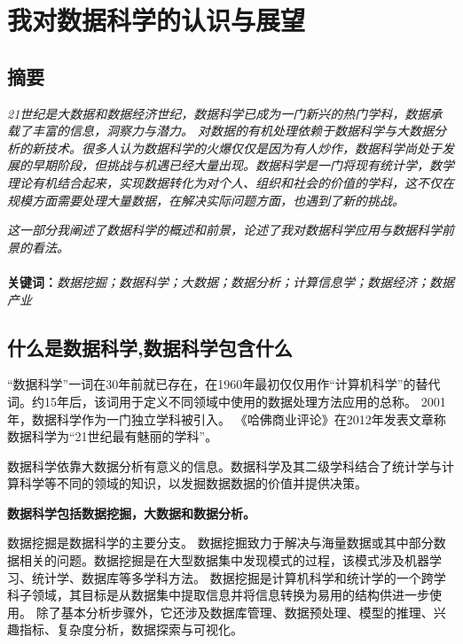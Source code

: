 \documentclass[a4paper, 11pt,twoside=true,UTF8]{scrartcl}
\begin{document}
\restoregeometry
\setcounter{page}{1}
\tableofcontents
\newpage
{}
\restoregeometry

\section{我对数据科学的认识与展望}
\subsection*{摘要}

\qquad \textit{21世纪是大数据和数据经济世纪，数据科学已成为一门新兴的热门学科，数据承载了丰富的信息，洞察力与潜力。 对数据的有机处理依赖于数据科学与大数据分析的新技术。很多人认为数据科学的火爆仅仅是因为有人炒作，数据科学尚处于发展的早期阶段，但挑战与机遇已经大量出现。数据科学是一门将现有统计学，数学理论有机结合起来，实现数据转化为对个人、组织和社会的价值的学科，这不仅在规模方面需要处理大量数据，在解决实际问题方面，也遇到了新的挑战。}

\textit{这一部分我阐述了数据科学的概述和前景，论述了我对数据科学应用与数据科学前景的看法。}
\\ \\
\textbf{关键词：}\textit{数据挖掘；数据科学；大数据；数据分析；计算信息学；数据经济；数据产业}

\subsection{什么是数据科学,数据科学包含什么}
\qquad “数据科学”一词在30年前就已存在，在1960年最初仅仅用作“计算机科学”的替代词。约15年后，该词用于定义不同领域中使用的数据处理方法应用的总称。 2001年，数据科学作为一门独立学科被引入。 《哈佛商业评论》在2012年发表文章称数据科学为“21世纪最有魅丽的学科”。

数据科学依靠大数据分析有意义的信息。数据科学及其二级学科结合了统计学与计算科学等不同的领域的知识，以发掘数据数据的价值并提供决策。

\textbf{数据科学包括数据挖掘，大数据和数据分析。}

数据挖掘是数据科学的主要分支。 数据挖掘致力于解决与海量数据或其中部分数据相关的问题。数据挖掘是在大型数据集中发现模式的过程，该模式涉及机器学习、统计学、数据库等多学科方法。 数据挖掘是计算机科学和统计学的一个跨学科子领域，其目标是从数据集中提取信息并将信息转换为易用的结构供进一步使用。 除了基本分析步骤外，它还涉及数据库管理、数据预处理、模型的推理、兴趣指标、复杂度分析，数据探索与可视化。
\end{document}
